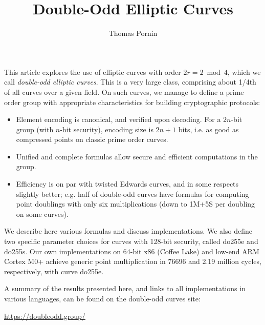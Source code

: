 \documentclass{llncs}
\makeatletter
\renewenvironment{abstract}{%
      \list{}{\advance\topsep by0.35cm\relax\small
      \leftmargin=1cm
      \labelwidth=\z@
      \listparindent=\z@
      \itemindent\listparindent
      \rightmargin\leftmargin}\item[\hskip\labelsep
                                    \textsf{\textbf{\abstractname}}]}
    {\endlist}
\newenvironment{extranote}{%
      \list{}{\advance\topsep by0.35cm\relax\small
      \leftmargin=1cm
      \labelwidth=\z@
      \listparindent=\z@
      \itemindent\listparindent
      \rightmargin\leftmargin}\item[\hskip\labelsep
                                    \textsf{\textbf{Note.}}]}
    {\endlist}
\makeatother
\begin{document}
\title{\textsf{Double-Odd Elliptic Curves}}

\author{Thomas Pornin}

\maketitle
\noindent{}

\begin{abstract}
This article explores the use of elliptic curves with order
$2r = 2\bmod 4$, which we call \emph{double-odd elliptic curves}. This is
a very large class, comprising about 1/4th of all curves over a given
field. On such curves, we manage to define a prime order group with
appropriate characteristics for building cryptographic protocols:
\begin{itemize}
    \item Element encoding is canonical, and verified upon decoding. For
    a $2n$-bit group (with $n$-bit security), encoding size is $2n+1$ bits,
    i.e. as good as compressed points on classic prime order curves.
    \item Unified and complete formulas allow secure and efficient
    computations in the group.
    \item Efficiency is on par with twisted Edwards curves, and in some
    respects slightly better; e.g. half of double-odd curves have formulas
    for computing point doublings with only six multiplications (down to
    1M+5S per doubling on some curves).
\end{itemize}
We describe here various formulas and discuss implementations. We also
define two specific parameter choices for curves with 128-bit
security, called do255e and do255s. Our own implementations on 64-bit
x86 (Coffee Lake) and low-end ARM Cortex M0+ achieve generic point
multiplication in 76696 and 2.19 million cycles, respectively, with
curve do255e.
\end{abstract}

\begin{extranote}
A summary of the results presented here, and links to all implementations
in various languages, can be found on the double-odd curves site:
\begin{center}
    \vspace{-4ex}
    \url{https://doubleodd.group/}
\end{center}
\end{extranote}
\end{document}
